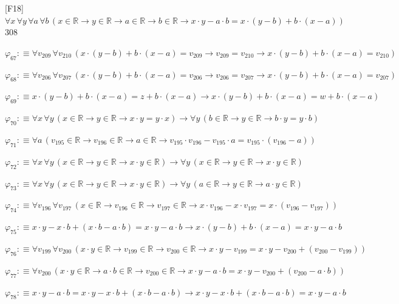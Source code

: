 \begin{fullproof}{[F18]}{$\forall x\,\forall y\,\forall a\,\forall b\,(x \in \mathbb{R} \to y \in \mathbb{R} \to a \in \mathbb{R} \to b \in \mathbb{R} \to x \cdot y - a \cdot b = x \cdot (y - b) + b \cdot (x - a))$}{308}
\begin{abbrevlist}
\item $\varphi_{67} :\equiv \forall v_{209}\,\forall v_{210}\,(x \cdot (y - b) + b \cdot (x - a) = v_{209} \to v_{209} = v_{210} \to x \cdot (y - b) + b \cdot (x - a) = v_{210})$
\item $\varphi_{68} :\equiv \forall v_{206}\,\forall v_{207}\,(x \cdot (y - b) + b \cdot (x - a) = v_{206} \to v_{206} = v_{207} \to x \cdot (y - b) + b \cdot (x - a) = v_{207})$
\item $\varphi_{69} :\equiv x \cdot (y - b) + b \cdot (x - a) = z + b \cdot (x - a) \to x \cdot (y - b) + b \cdot (x - a) = w + b \cdot (x - a)$
\item $\varphi_{70} :\equiv \forall x\,\forall y\,(x \in \mathbb{R} \to y \in \mathbb{R} \to x \cdot y = y \cdot x) \to \forall y\,(b \in \mathbb{R} \to y \in \mathbb{R} \to b \cdot y = y \cdot b)$
\item $\varphi_{71} :\equiv \forall a\,(v_{195} \in \mathbb{R} \to v_{196} \in \mathbb{R} \to a \in \mathbb{R} \to v_{195} \cdot v_{196} - v_{195} \cdot a = v_{195} \cdot (v_{196} - a))$
\item $\varphi_{72} :\equiv \forall x\,\forall y\,(x \in \mathbb{R} \to y \in \mathbb{R} \to x \cdot y \in \mathbb{R}) \to \forall y\,(x \in \mathbb{R} \to y \in \mathbb{R} \to x \cdot y \in \mathbb{R})$
\item $\varphi_{73} :\equiv \forall x\,\forall y\,(x \in \mathbb{R} \to y \in \mathbb{R} \to x \cdot y \in \mathbb{R}) \to \forall y\,(a \in \mathbb{R} \to y \in \mathbb{R} \to a \cdot y \in \mathbb{R})$
\item $\varphi_{74} :\equiv \forall v_{196}\,\forall v_{197}\,(x \in \mathbb{R} \to v_{196} \in \mathbb{R} \to v_{197} \in \mathbb{R} \to x \cdot v_{196} - x \cdot v_{197} = x \cdot (v_{196} - v_{197}))$
\item $\varphi_{75} :\equiv x \cdot y - x \cdot b + (x \cdot b - a \cdot b) = x \cdot y - a \cdot b \to x \cdot (y - b) + b \cdot (x - a) = x \cdot y - a \cdot b$
\item $\varphi_{76} :\equiv \forall v_{199}\,\forall v_{200}\,(x \cdot y \in \mathbb{R} \to v_{199} \in \mathbb{R} \to v_{200} \in \mathbb{R} \to x \cdot y - v_{199} = x \cdot y - v_{200} + (v_{200} - v_{199}))$
\item $\varphi_{77} :\equiv \forall v_{200}\,(x \cdot y \in \mathbb{R} \to a \cdot b \in \mathbb{R} \to v_{200} \in \mathbb{R} \to x \cdot y - a \cdot b = x \cdot y - v_{200} + (v_{200} - a \cdot b))$
\item $\varphi_{78} :\equiv x \cdot y - a \cdot b = x \cdot y - x \cdot b + (x \cdot b - a \cdot b) \to x \cdot y - x \cdot b + (x \cdot b - a \cdot b) = x \cdot y - a \cdot b$

\end{abbrevlist}
\end{fullproof}
